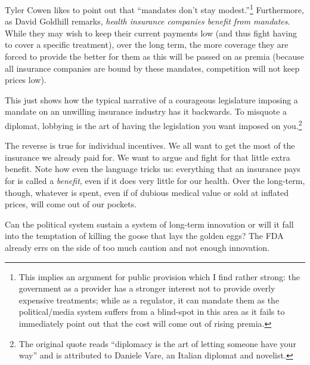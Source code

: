 Tyler Cowen likes to point out that ``mandates don't stay
modest.''\footnote{This implies an argument for public provision which I find
rather strong: the government as a provider has a stronger interest not to
provide overly expensive treatments; while as a regulator, it can mandate them
as the political/media system suffers from a blind-spot in this area as it
fails to immediately point out that the cost will come out of rising premia.}
Furthermore, as David Goldhill remarks, \emph{health insurance companies
benefit from mandates}. While they may wish to keep their current payments low
(and thus fight having to cover a specific treatment), over the long term, the
more coverage they are forced to provide the better for them as this will be
passed on as premia (because all insurance companies are bound by these
mandates, competition will not keep prices low).

This just shows how the typical narrative of a courageous legislature imposing
a mandate on an unwilling insurance industry has it backwards. To misquote a
diplomat, lobbying is the art of having the legislation you want imposed on
you.\footnote{The original quote reads ``diplomacy is the art of letting
someone have your way'' and is attributed to Daniele Vare, an Italian diplomat
and novelist.}

The reverse is true for individual incentives. We all want to get the most of
the insurance we already paid for. We want to argue and fight for that little
extra benefit. Note how even the language tricks us: everything that an
insurance pays for is called a \emph{benefit}, even if it does very little for
our health. Over the long-term, though, whatever is spent, even if of dubious
medical value or sold at inflated prices, will come out of our pockets.

Can the political system sustain a system of long-term innovation or will it
fall into the temptation of killing the goose that lays the golden eggs? The
FDA already errs on the side of too much caution and not enough innovation.

